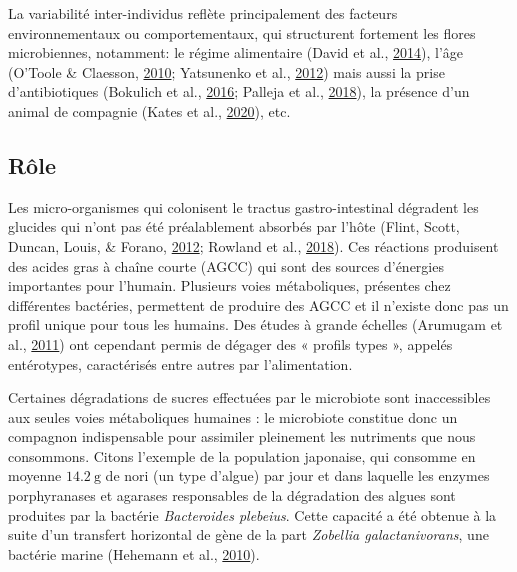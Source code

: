 \documentclass[12pt,a4paper]{reedthesis}
\theoremstyle{definition}
\theoremstyle{definition}
\theoremstyle{definition}
\theoremstyle{remark}
\begin{document}
La variabilité inter-individus reflète principalement des facteurs environnementaux ou comportementaux, qui structurent fortement les flores microbiennes, notamment: le régime alimentaire (David et al., \protect\hyperlink{ref-david2014diet}{2014}), l'âge (O'Toole \& Claesson, \protect\hyperlink{ref-otoole2010gut}{2010}; Yatsunenko et al., \protect\hyperlink{ref-yatsunenko2012human}{2012}) mais aussi la prise d'antibiotiques (Bokulich et al., \protect\hyperlink{ref-bokulich2016antibiotics}{2016}; Palleja et al., \protect\hyperlink{ref-palleja2018recovery}{2018}), la présence d'un animal de compagnie (Kates et al., \protect\hyperlink{ref-kates2020household}{2020}), etc.

\hypertarget{ruxf4le}{%
\subsection{Rôle}\label{ruxf4le}}

Les micro-organismes qui colonisent le tractus gastro-intestinal dégradent les glucides qui n'ont pas été préalablement absorbés par l'hôte (Flint, Scott, Duncan, Louis, \& Forano, \protect\hyperlink{ref-flint2012microbial}{2012}; Rowland et al., \protect\hyperlink{ref-rowland2018gut}{2018}). Ces réactions produisent des acides gras à chaîne courte (AGCC) qui sont des sources d'énergies importantes pour l'humain. Plusieurs voies métaboliques, présentes chez différentes bactéries, permettent de produire des AGCC et il n'existe donc pas un profil unique pour tous les humains. Des études à grande échelles (Arumugam et al., \protect\hyperlink{ref-arumugam2011enterotypes}{2011}) ont cependant permis de dégager des « profils types », appelés entérotypes, caractérisés entre autres par l'alimentation.

Certaines dégradations de sucres effectuées par le microbiote sont inaccessibles aux seules voies métaboliques humaines : le microbiote constitue donc un compagnon indispensable pour assimiler pleinement les nutriments que nous consommons. Citons l'exemple de la population japonaise, qui consomme en moyenne \(14.2~\text{g}\) de nori (un type d'algue) par jour et dans laquelle les enzymes porphyranases et agarases responsables de la dégradation des algues sont produites par la bactérie \emph{Bacteroides plebeius}. Cette capacité a été obtenue à la suite d'un transfert horizontal de gène de la part \emph{Zobellia galactanivorans}, une bactérie marine (Hehemann et al., \protect\hyperlink{ref-hehemann2010transfer}{2010}).
\end{document}
